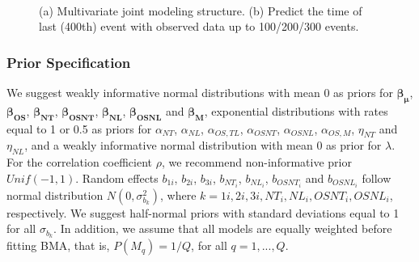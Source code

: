 \begin{figure}[ht]
\centering
{}
\\
\caption{(a) Multivariate joint modeling structure. (b) Predict the time of last (400th) event with observed data up to 100/200/300 events.}
\end{figure}

\subsubsection{Prior Specification}
We suggest weakly informative normal distributions with mean 0 as priors for $\boldsymbol{\beta_{\mu}}$, $\boldsymbol{\beta_{OS}}$, $\boldsymbol{\beta_{NT}}$, $\boldsymbol{\beta_{OSNT}}$, $\boldsymbol{\beta_{NL}}$, $\boldsymbol{\beta_{OSNL}}$ and $\boldsymbol{\beta_{M}}$, exponential distributions with rates equal to 1 or 0.5 as priors for $\alpha_{NT}$, $\alpha_{NL}$, $\alpha_{OS,TL}$, $\alpha_{OSNT}$, $\alpha_{OSNL}$, $\alpha_{OS,M}$, $\eta_{NT}$ and $\eta_{NL}$, and a weakly informative normal distribution with mean 0 as prior for $\lambda$. For the correlation coefficient $\rho$, we recommend non-informative prior $Unif(-1, 1)$. Random effects $b_{1i}$, $b_{2i}$, $b_{3i}$, $b_{NT_i}$, $b_{NL_i}$, $b_{OSNT_i}$ and $b_{OSNL_i}$ follow normal distribution $N(0, \sigma_{b_k}^2)$, where $k = 1i, 2i, 3i, NT_i, NL_i, OSNT_i, OSNL_i$, respectively. We suggest half-normal priors with standard deviations equal to 1 for all $\sigma_{b_{k}}$. In addition, we assume that all models are equally weighted before fitting \ac{BMA}, that is, $P(M_q) = 1/Q$, for all $q = 1,...,Q$.


